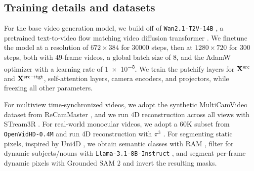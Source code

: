 





\subsection{Training details and datasets}
\label{sec:method:details}

For the base video generation model, we build off of \texttt{Wan2.1-T2V-14B} \cite{wan2025}, a pretrained text-to-video flow matching \cite{lipman2023flowmatching} video diffusion transformer \cite{peebles2023dit}. We finetune the model at a resolution of $672 \times 384$ for \num[group-separator={,}]{30000} steps, then at $1280 \times 720$ for \num[group-separator={,}]{300} steps, both with $49$-frame videos, a global batch size of $8$, and the AdamW optimizer with a learning rate of \num{1e-5}. We train the patchify layers for $\mathbf{X}^{\mathrm{src}}$ and $\mathbf{X}^{\mathrm{src \to tgt}}$, self-attention layers, camera encoders, and projectors, while freezing all other parameters.

 For multiview time-synchronized videos, we adopt the synthetic MultiCamVideo dataset from ReCamMaster \cite{bai2025recammaster}, and we run 4D reconstruction across all views with STream3R \cite{lan2025stream3r}. For real-world monocular videos, we adopt a 60K subset from \texttt{OpenVidHD-0.4M} \cite{nan2025openvid} and run 4D reconstruction with $\pi^3$ \cite{wang2025pi3}. For segmenting static pixels, inspired by Uni4D \cite{yao2025uni4d}, we obtain semantic classes with RAM \cite{zhang2023ram}, filter for dynamic subjects/nouns with \texttt{Llama-3.1-8B-Instruct} \cite{llama2024llama3}, and segment per-frame dynamic pixels with Grounded SAM 2 \cite{ravi2024sam2, ren2024groundingdino, ren2024groundedsam} and invert the resulting masks.
